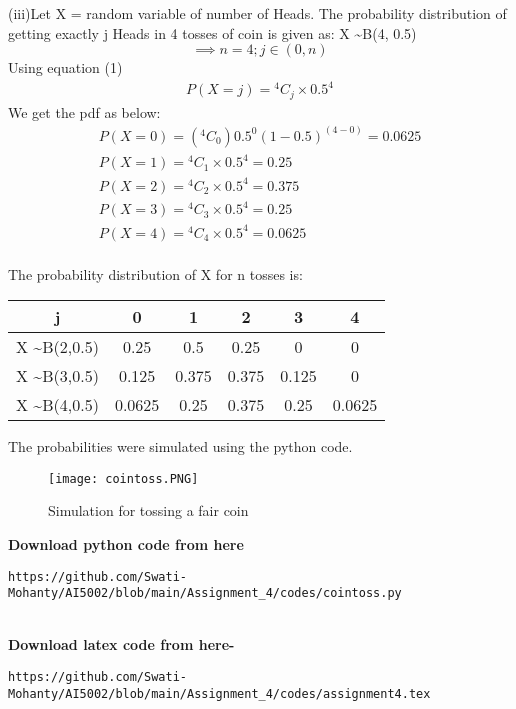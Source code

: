 \documentclass[journal,12pt,twocolumn]{IEEEtran}
\newcommand*{\Comb}[2]{{}^{#1}C_{#2}}%
\begin{document}
(iii)Let X = random variable of number of Heads.
The probability distribution of getting exactly j Heads in 4 tosses of coin is given as:  X \textasciitilde B(4, 0.5) 
\[\implies n=4; j \in (0,n)\]
Using equation (1)
\begin{align}
    P(X = j)  =\Comb{4}{j}\times { 0.5^4}
\end{align}
We get the pdf as below:
\begin{align}
    P(X=0) =(\Comb{4}{0}){ 0.5^0 (1-0.5)^{(4-0)}}
    =0.0625
    \\P(X=1) = \Comb{4}{1}\times { 0.5^4} = 0.25
    \\P(X=2) = \Comb{4}{2}\times { 0.5^4} = 0.375
    \\P(X=3) = \Comb{4}{3}\times { 0.5^4} = 0.25
    \\P(X=4) = \Comb{4}{4}\times { 0.5^4} = 0.0625
\end{align}
\\The probability distribution of X for n tosses is: 

\begin{center}
\begin{tabular}{ |c|c|c|c|c|c| } 
 \hline
 j & 0 & 1 & 2 & 3&4 \\ \hline
  X \textasciitilde B(2,0.5) & 0.25 &0.5 & 0.25 & 0 & 0\\ 
 \hline
 X \textasciitilde B(3,0.5) & 0.125& 0.375 & 0.375 & 0.125 & 0 \\ 
 \hline
X \textasciitilde B(4,0.5) & 0.0625 & 0.25 & 0.375 & 0.25 & 0.0625 \\ 
 \hline
\end{tabular}
\end{center}
The probabilities were simulated using the python code.
\begin{figure}[h]
\renewcommand{\theenumi}{1}
\centering
\texttt{[image: cointoss.PNG]}
\caption{Simulation for tossing a fair coin  }
\label{Fig:1}
\end{figure}

\textbf{Download python code from here}\\
\begin{lstlisting}
https://github.com/Swati-Mohanty/AI5002/blob/main/Assignment_4/codes/cointoss.py
\end{lstlisting}
\\\textbf{Download latex code from here-}\\
\begin{lstlisting}
https://github.com/Swati-Mohanty/AI5002/blob/main/Assignment_4/codes/assignment4.tex
\end{lstlisting}
\end{document}
